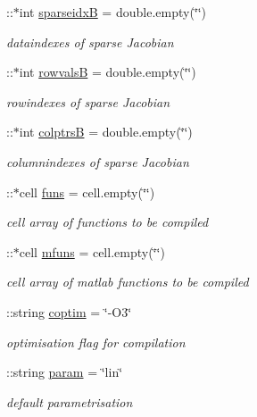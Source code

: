 \begin{DoxyCompactItemize}
\+::$\ast$int \mbox{\hyperlink{classamimodel_adcfae93a688a66f1954d0832f51e4cc0}{sparseidxB}} = double.\+empty(\char`\"{}\char`\"{})
\begin{DoxyCompactList}\small\item\em dataindexes of sparse Jacobian \end{DoxyCompactList}\item 
\+::$\ast$int \mbox{\hyperlink{classamimodel_a1ba81ee0e28fe7c7576911973c82be70}{rowvalsB}} = double.\+empty(\char`\"{}\char`\"{})
\begin{DoxyCompactList}\small\item\em rowindexes of sparse Jacobian \end{DoxyCompactList}\item 
\+::$\ast$int \mbox{\hyperlink{classamimodel_a3a4891c5565b544dd7d4362dbbfaadf7}{colptrsB}} = double.\+empty(\char`\"{}\char`\"{})
\begin{DoxyCompactList}\small\item\em columnindexes of sparse Jacobian \end{DoxyCompactList}\item 
\+::$\ast$cell \mbox{\hyperlink{classamimodel_af80b2560853c3df2b09fef2a198cf5b8}{funs}} = cell.\+empty(\char`\"{}\char`\"{})
\begin{DoxyCompactList}\small\item\em cell array of functions to be compiled \end{DoxyCompactList}\item 
\+::$\ast$cell \mbox{\hyperlink{classamimodel_a05ea829e5f102fa401df811ba1614ffb}{mfuns}} = cell.\+empty(\char`\"{}\char`\"{})
\begin{DoxyCompactList}\small\item\em cell array of matlab functions to be compiled \end{DoxyCompactList}\item 
\+::string \mbox{\hyperlink{classamimodel_ad99abcd270ac97546c46292ebc6c2e0a}{coptim}} = \char`\"{}-\/O3\char`\"{}
\begin{DoxyCompactList}\small\item\em optimisation flag for compilation \end{DoxyCompactList}\item 
\+::string \mbox{\hyperlink{classamimodel_a51f20d6b1b54a2eee3be0e8adc96a0ae}{param}} = \char`\"{}lin\char`\"{}
\begin{DoxyCompactList}\small\item\em default parametrisation \end{DoxyCompactList}\item 

\end{DoxyCompactItemize}
